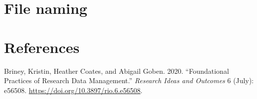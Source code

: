 \documentclass[
  letterpaper,
  DIV=11,
  numbers=noendperiod]{scrreprt}
\newlength{\cslhangindent}
\newlength{\cslentryspacingunit} %
\newenvironment{CSLReferences}[2] %
 {%
  \setlength{\parindent}{0pt}
  \ifodd #1
  \let\oldpar\par
  \def\par{\hangindent=\cslhangindent\oldpar}
  \fi
  \setlength{\parskip}{#2\cslentryspacingunit}
 }%
 {}
\begin{document}
\hypertarget{file-naming}{%
\chapter{File naming}\label{file-naming}}


\hypertarget{references}{%
\chapter*{References}\label{references}}


\hypertarget{refs}{}
\begin{CSLReferences}{1}{0}
\leavevmode{}%
Briney, Kristin, Heather Coates, and Abigail Goben. 2020.
{``Foundational Practices of Research Data Management.''} \emph{Research
Ideas and Outcomes} 6 (July): e56508.
\url{https://doi.org/10.3897/rio.6.e56508}.

\end{CSLReferences}
\end{document}
